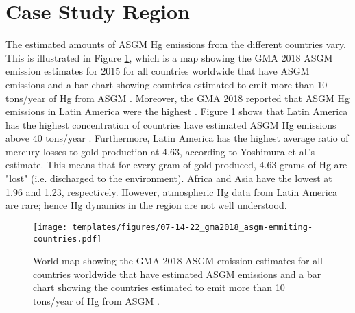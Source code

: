 \section{Case Study Region}
\begin{flushleft}
The estimated amounts of ASGM Hg emissions from the different countries vary. This is illustrated in Figure \ref{fig:global_asgm_emissions}, which is a map showing the GMA 2018 ASGM \hg emission estimates for 2015 for all countries worldwide that have ASGM \hg emissions and a bar chart showing countries estimated to emit more than 10 tons/year of Hg from ASGM \cite{united_nations_environment_programme_technical_2019}. Moreover, the GMA 2018 reported that ASGM Hg emissions in Latin America were the highest \cite{united_nations_environment_programme_technical_2019}. Figure \ref{fig:global_asgm_emissions} shows that Latin America has the highest concentration of countries have estimated ASGM Hg emissions above 40 tons/year \cite{united_nations_environment_programme_technical_2019}. Furthermore, Latin America has the highest average ratio of mercury losses to gold production at 4.63, according to Yoshimura et al.'s\cite{yoshimura_estimation_2021} estimate. This means that for every gram of gold produced, 4.63 grams of Hg are "lost" (i.e. discharged to the environment). Africa and Asia have the lowest at 1.96 and 1.23, respectively.  However, atmospheric Hg data from Latin America are rare; hence Hg dynamics in the region are not well understood. 
\end{flushleft}

\begin{figure}[H]
  \texttt{[image: templates/figures/07-14-22\_gma2018\_asgm-emmiting-countries.pdf]}
  \centering
  \caption[World map showing the GMA 2018 ASGM \hg emission estimates for all countries worldwide that have estimated ASGM \hg emissions and a bar chart showing countries estimated to emit more than 10 tons/year  Hg from ASGM ]{World map showing the GMA 2018 ASGM \hg emission estimates for all countries worldwide that have estimated ASGM \hg emissions and a bar chart showing the countries estimated to emit more than 10 tons/year of Hg from ASGM \cite{united_nations_environment_programme_technical_2019}.}
  \label{fig:global_asgm_emissions}
\end{figure}
\FloatBarrier

